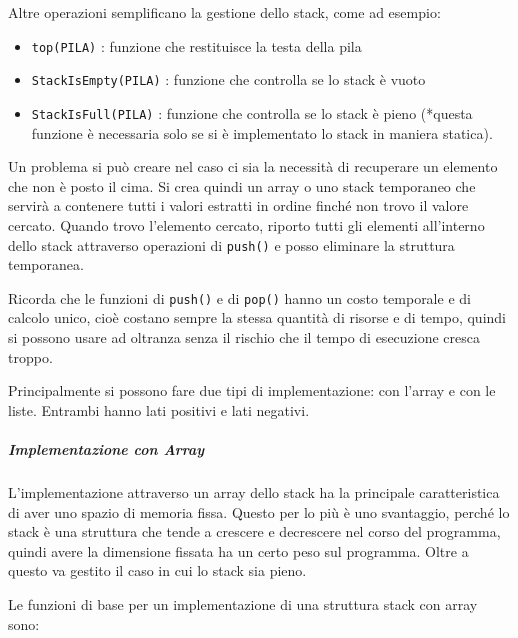 \documentclass[
]{article}
\begin{document}
Altre operazioni semplificano la gestione dello stack, come ad esempio:

\begin{itemize}
\item
  \texttt{top(PILA)} : funzione che restituisce la testa della pila
\item
  \texttt{StackIsEmpty(PILA)} : funzione che controlla se lo stack è
  vuoto
\item
  \texttt{StackIsFull(PILA)} : funzione che controlla se lo stack è
  pieno (*questa funzione è necessaria solo se si è implementato lo
  stack in maniera statica).
\end{itemize}

Un problema si può creare nel caso ci sia la necessità di recuperare un
elemento che non è posto il cima. Si crea quindi un array o uno stack
temporaneo che servirà a contenere tutti i valori estratti in ordine
finché non trovo il valore cercato. Quando trovo l'elemento cercato,
riporto tutti gli elementi all'interno dello stack attraverso operazioni
di \texttt{push()} e posso eliminare la struttura temporanea.

Ricorda che le funzioni di \texttt{push()} e di \texttt{pop()} hanno un
costo temporale e di calcolo unico, cioè costano sempre la stessa
quantità di risorse e di tempo, quindi si possono usare ad oltranza
senza il rischio che il tempo di esecuzione cresca troppo.

Principalmente si possono fare due tipi di implementazione: con l'array
e con le liste. Entrambi hanno lati positivi e lati negativi.

\hypertarget{header-n1350}{%
\subparagraph{\texorpdfstring{Implementazione con
\emph{Array}}{Implementazione con Array}}\label{header-n1350}}

L'implementazione attraverso un array dello stack ha la principale
caratteristica di aver uno spazio di memoria fissa. Questo per lo più è
uno svantaggio, perché lo stack è una struttura che tende a crescere e
decrescere nel corso del programma, quindi avere la dimensione fissata
ha un certo peso sul programma. Oltre a questo va gestito il caso in cui
lo stack sia pieno.

Le funzioni di base per un implementazione di una struttura stack con
array sono:
\end{document}
